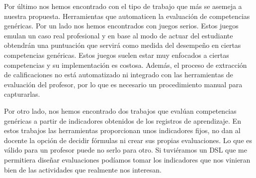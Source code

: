 Por último nos hemos encontrado con el tipo de trabajo que más se asemeja a nuestra propuesta. Herramientas que automaticen la evaluación de competencias genéricas. Por un lado nos hemos encontrados con juegos serios. Estos juegos emulan un caso real profesional y en base al modo de actuar del estudiante obtendrán una puntuación que servirá como medida del desempeño en ciertas competencias genéricas. Estos juegos suelen estar muy enfocados a ciertas competencias y su implementación es costosa. Además, el proceso de extracción de calificaciones no está automatizado ni integrado con las herramientas de evaluación del profesor, por lo que es necesario un procedimiento manual para capturarlas.

Por otro lado, nos hemos encontrado dos trabajos que evalúan competencias genéricas a partir de indicadores obtenidos de los registros de aprendizaje. En estos trabajos las herramientas proporcionan unos indicadores fijos, no dan al docente la opción de decidir fórmulas ni crear sus propias evaluaciones. Lo que es válido para un profesor puede no serlo para otro. Si tuviéramos un DSL que me permitiera diseñar evaluaciones podíamos tomar los indicadores que nos vinieran bien de las actividades que realmente nos interesan.

\pagestyle{fancy}




